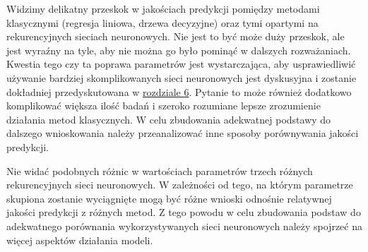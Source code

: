 \documentclass[10pt,a4paper]{article}
\begin{document}
Widzimy delikatny przeskok w jakościach predykcji pomiędzy metodami klasycznymi (regresja liniowa, drzewa decyzyjne) oraz tymi opartymi na rekurencyjnych sieciach neuronowych. Nie jest to być może duży przeskok, ale jest wyraźny na tyle, aby nie można go było pominąć w dalszych rozważaniach. Kwestia tego czy ta poprawa parametrów jest wystarczająca, aby usprawiedliwić używanie bardziej skomplikowanych sieci neuronowych jest dyskusyjna i zostanie dokładniej przedyskutowana w \hyperlink{section.6}{rozdziale 6}. Pytanie to może również dodatkowo komplikować większa ilość badań i szeroko rozumiane lepsze zrozumienie działania metod klasycznych. W celu zbudowania adekwatnej podstawy do dalszego wnioskowania należy przeanalizować inne sposoby porównywania jakości predykcji. 

Nie widać podobnych różnic w wartościach parametrów trzech różnych rekurencyjnych sieci neuronowych. W zależności od tego, na którym parametrze skupiona zostanie wyciągnięte mogą być różne wnioski odnośnie relatywnej jakości predykcji z różnych metod. Z tego powodu w celu zbudowania podstaw do adekwatnego porównania wykorzystywanych sieci neuronowych należy spojrzeć na więcej aspektów działania modeli.
\end{document}
